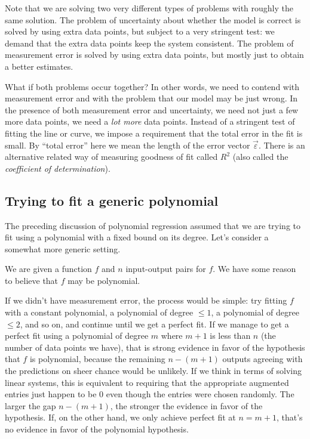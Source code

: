 \documentclass[10pt]{amsart}
\begin{document}
Note that we are solving two very different types of problems with
roughly the same solution. The problem of uncertainty about whether
the model is correct is solved by using extra data points, but subject
to a very stringent test: we demand that the extra data points keep
the system consistent. The problem of measurement error is solved by
using extra data points, but mostly just to obtain a better estimates.

What if both problems occur together? In other words, we need to
contend with measurement error and with the problem that our model may
be just wrong. In the presence of both measurement error and
uncertainty, we need not just a few more data points, we need a {\em
  lot more} data points. Instead of a stringent test of fitting the
line or curve, we impose a requirement that the total error in the fit
is small. By ``total error'' here we mean the length of the error
vector $\vec{\varepsilon}$. There is an alternative related way of
measuring goodness of fit called $R^2$ (also called the {\em
  coefficient of determination}).

\subsection{Trying to fit a generic polynomial}

The preceding discussion of polynomial regression assumed that we are
trying to fit using a polynomial with a fixed bound on its
degree. Let's consider a somewhat more generic setting.

We are given a function $f$ and $n$ input-output pairs for $f$. We
have some reason to believe that $f$ may be polynomial.

If we didn't have measurement error, the process would be simple: try
fitting $f$ with a constant polynomial, a polynomial of degree $\le
1$, a polynomial of degree $\le 2$, and so on, and continue until we
get a perfect fit. If we manage to get a perfect fit using a
polynomial of degree $m$ where $m + 1$ is less than $n$ (the number of
data points we have), that is strong evidence in favor of the
hypothesis that $f$ is polynomial, because the remaining $n - (m + 1)$
outputs agreeing with the predictions on sheer chance would be
unlikely. If we think in terms of solving linear systems, this is
equivalent to requiring that the appropriate augmented entries just
happen to be $0$ even though the entries were chosen randomly. The
larger the gap $n - (m + 1)$, the stronger the evidence in favor of
the hypothesis. If, on the other hand, we only achieve perfect fit at
$n = m + 1$, that's no evidence in favor of the polynomial hypothesis.
\end{document}
